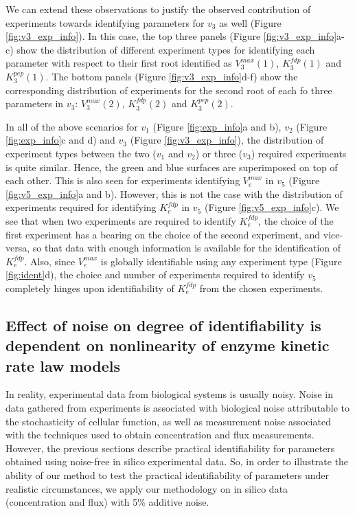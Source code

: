 \documentclass[10pt]{article}
\begin{document}
	We can extend these observations to justify the observed contribution of experiments towards identifying parameters for $v_3$ as well (Figure \ref{fig:v3_exp_info}). In this case, the top three panels (Figure \ref{fig:v3_exp_info}a-c) show the distribution of different experiment types for identifying each parameter with respect to their first root identified as $V_3^{max}(1)$, $K_3^{fdp}(1)$ and $K_3^{pep}(1)$. The bottom panels (Figure \ref{fig:v3_exp_info}d-f) show the corresponding distribution of experiments for the second root of each fo three parameters in $v_3$: $V_3^{max}(2)$, $K_3^{fdp}(2)$ and $K_3^{pep}(2)$. 
	
	In all of the above scenarios for $v_1$ (Figure \ref{fig:exp_info}a and b), $v_2$ (Figure \ref{fig:exp_info}c and d) and $v_3$ (Figure \ref{fig:v3_exp_info}), the distribution of experiment types between the two ($v_1$ and $v_2$) or three ($v_3$) required experiments is quite similar. Hence, the green and blue surfaces are superimposed on top of each other. This is also seen for experiments identifying $V_e^{max}$ in $v_5$ (Figure \ref{fig:v5_exp_info}a and b). However, this is not the case with the distribution of experiments required for identifying $K_e^{fdp}$ in $v_5$ (Figure \ref{fig:v5_exp_info}c). We see that when two experiments are required to identify $K_e^{fdp}$, the choice of the first experiment has a bearing on the choice of the second experiment, and vice-versa, so that data with enough information is available for the identification of $K_e^{fdp}$. Also, since $V_e^{max}$ is globally identifiable using any experiment type (Figure \ref{fig:ident}d), the choice and number of experiments required to identify $v_5$ completely hinges upon identifiability of $K_e^{fdp}$ from the chosen experiments.	
		
	\subsection{Effect of noise on degree of identifiability is dependent on nonlinearity of enzyme kinetic rate law models}\label{sec:noise}
	In reality, experimental data from biological systems is usually noisy. Noise in data gathered from experiments is associated with biological noise attributable to the stochasticity of cellular function, as well as measurement noise associated with the techniques used to obtain concentration and flux measurements. However, the previous sections describe practical identifiability for parameters obtained using noise-free in silico experimental data. So, in order to illustrate the ability of our method to test the practical identifiability of parameters under realistic circumstances, we apply our methodology on in silico data (concentration and flux) with 5\% additive noise. 
	
\end{document}
